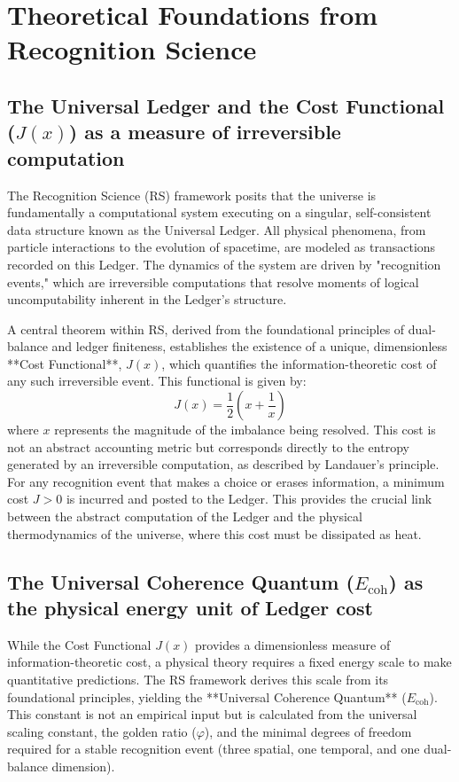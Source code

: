 \documentclass[12pt, aip, jcp]{revtex4-2} %
\begin{document}
\section{Theoretical Foundations from Recognition Science}

\subsection{The Universal Ledger and the Cost Functional (\(J(x)\)) as a measure of irreversible computation}

The Recognition Science (RS) framework posits that the universe is fundamentally a computational system executing on a singular, self-consistent data structure known as the Universal Ledger. All physical phenomena, from particle interactions to the evolution of spacetime, are modeled as transactions recorded on this Ledger. The dynamics of the system are driven by "recognition events," which are irreversible computations that resolve moments of logical uncomputability inherent in the Ledger's structure.

A central theorem within RS, derived from the foundational principles of dual-balance and ledger finiteness, establishes the existence of a unique, dimensionless **Cost Functional**, \(J(x)\), which quantifies the information-theoretic cost of any such irreversible event. This functional is given by:
\begin{equation}
    J(x) = \frac{1}{2}\left(x + \frac{1}{x}\right)
\end{equation}
where \(x\) represents the magnitude of the imbalance being resolved. This cost is not an abstract accounting metric but corresponds directly to the entropy generated by an irreversible computation, as described by Landauer's principle. For any recognition event that makes a choice or erases information, a minimum cost \(J > 0\) is incurred and posted to the Ledger. This provides the crucial link between the abstract computation of the Ledger and the physical thermodynamics of the universe, where this cost must be dissipated as heat.

\subsection{The Universal Coherence Quantum (\(E_{\text{coh}}\)) as the physical energy unit of Ledger cost}

While the Cost Functional \(J(x)\) provides a dimensionless measure of information-theoretic cost, a physical theory requires a fixed energy scale to make quantitative predictions. The RS framework derives this scale from its foundational principles, yielding the **Universal Coherence Quantum** (\(E_{\text{coh}}\)). This constant is not an empirical input but is calculated from the universal scaling constant, the golden ratio (\(\varphi\)), and the minimal degrees of freedom required for a stable recognition event (three spatial, one temporal, and one dual-balance dimension).
\end{document}
